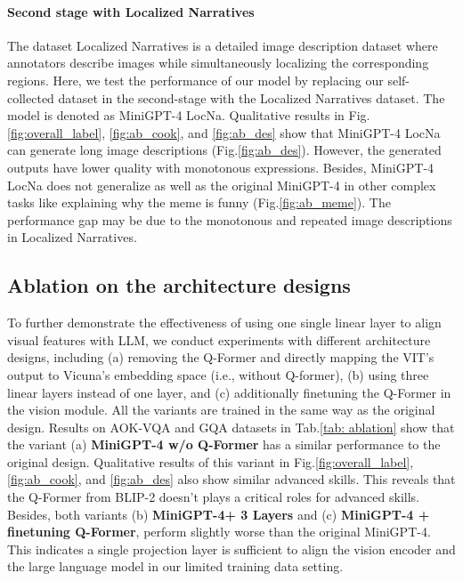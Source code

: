 \paragraph{Second stage with Localized Narratives }
The dataset Localized Narratives \citep{pont2020connecting} is a detailed image description dataset where 
annotators describe images while simultaneously localizing the corresponding regions.
Here, we test the performance of our model by replacing our self-collected dataset in the second-stage with the Localized Narratives dataset. The model is denoted as MiniGPT-4 LocNa. Qualitative results in Fig.\ref{fig:overall_label}, \ref{fig:ab_cook}, and \ref{fig:ab_des} show that MiniGPT-4 LocNa can generate long image descriptions (Fig.\ref{fig:ab_des}). However, the generated outputs have lower quality with monotonous expressions. Besides, MiniGPT-4 LocNa does not generalize as well as the original MiniGPT-4 in other complex tasks like explaining why the meme is funny (Fig.\ref{fig:ab_meme}). The performance gap may be due to the monotonous and repeated image descriptions in Localized Narratives.







\subsection{Ablation on the architecture designs}
To further demonstrate the effectiveness of using one single linear layer to align visual features with LLM, we conduct experiments with different architecture designs, including (a) removing the Q-Former and directly mapping the VIT’s output to Vicuna’s embedding space (i.e., without Q-former), (b) using three linear layers instead of one layer, and (c) additionally finetuning the Q-Former in the vision module. 
All the variants are trained in the same way as the original design. Results on AOK-VQA \citep{schwenk2022okvqa} and GQA \citep{hudson2019gqa} datasets in Tab.\ref{tab: ablation} show that the variant (a) \textbf{MiniGPT-4 w/o Q-Former} has a similar performance to the original design. 
Qualitative results of this variant in Fig.\ref{fig:overall_label}, \ref{fig:ab_cook}, and \ref{fig:ab_des} also show similar advanced skills.
This reveals that the Q-Former from BLIP-2 doesn't plays a critical roles for advanced skills. 
Besides, both variants (b) \textbf{MiniGPT-4+ 3 Layers} and (c) \textbf{MiniGPT-4 + finetuning Q-Former}, perform slightly worse than the original MiniGPT-4. 
This indicates a single projection layer is sufficient to align the vision encoder and the large language model in our limited training data setting.
